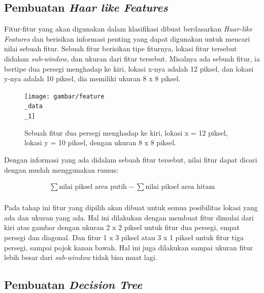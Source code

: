 
\subsection{Pembuatan \textit{Haar like Features}}

Fitur-fitur yang akan digunakan dalam klasifikasi dibuat 
berdasarkan \emph{Haar-like Features} dan berisikan informasi penting yang dapat digunakan 
untuk mencari nilai sebuah fitur. Sebuah fitur berisikan tipe fiturnya, lokasi fitur tersebut 
didalam \textit{sub-window}, dan ukuran dari fitur tersebut.
Misalnya ada sebuah fitur, ia bertipe dua persegi menghadap ke kiri, lokasi x-nya adalah 12 piksel, 
dan lokasi y-nya adalah 10 piksel, dia memiliki ukuran 8 x 8 piksel.

\begin{figure}[H]
  \centering{}
	\texttt{[image: gambar/feature\\\_data\\\_1]}
  \caption{Sebuah fitur dua persegi menghadap ke kiri, lokasi x = 12 piksel, 
  lokasi y = 10 piksel, dengan ukuran 8 x 8 piksel.}
\end{figure} 
Dengan informasi yang ada didalam sebuah fitur tersebut, nilai fitur dapat dicari dengan 
mudah menggunakan rumus:

\begin{equation}
  \begin{split}
    \sum \text{nilai piksel area putih} -  \sum \text{nilai piksel area hitam} \\ 
  \end{split}
\end{equation}

Pada tahap ini fitur yang dipilih akan dibuat untuk semua 
posibilitas lokasi yang ada dan ukuran yang ada. Hal ini dilakukan dengan 
membuat fitur dimulai dari kiri atas gambar dengan ukuran 2 x 2 piksel untuk fitur 
dua persegi, empat persegi dan diagonal. Dan fitur 1 x 3 piksel atau 3 x 1 piksel untuk fitur tiga persegi, 
sampai pojok kanan bawah. Hal ini juga dilakukan sampai ukuran fitur lebih besar 
dari \emph{sub-window} tidak bisa muat lagi.

\subsection{Pembuatan \textit{Decision Tree}}

